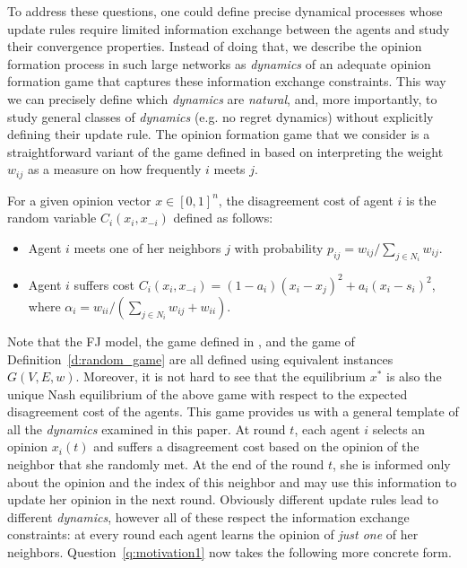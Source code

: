 To address these questions, one could define precise dynamical processes whose
update rules require limited information exchange between the agents and study
their convergence properties. Instead of doing that, we describe the opinion
formation process in such large networks as \emph{dynamics} of an adequate
opinion formation game that captures these information exchange constraints.
This way we can precisely define which \emph{dynamics} are \emph{natural}, and,
more importantly, to study general classes of \emph{dynamics} (e.g. no regret
dynamics) without explicitly defining their update rule.  The opinion formation
game that we consider is a straightforward variant of the game defined in
\cite{BKO11} based on interpreting the weight $w_{ij}$ as a measure on how
frequently $i$ meets $j$.
%
\begin{definition}\label{d:random_game}
  For a given opinion vector $x \in [0,1]^n$, the disagreement cost of agent
  $i$ is the random variable $C_i(x_i,x_{-i})$ defined as follows:
  \begin{itemize}
    \item Agent $i$ meets one of her neighbors $j$ with probability $p_{ij}=
      w_{ij}/\sum_{j\in N_i}w_{ij}$.
    \item Agent $i$ suffers cost $C_i(x_i , x_{-i}) = (1-a_i)(x_i-x_j)^2 +
      a_i(x_i-s_i)^2$, where $\alpha_i = w_{ii}/(\sum_{j\in
        N_i}w_{ij}+w_{ii})$.
  \end{itemize}
\end{definition}
%
Note that the FJ model, the game defined in \cite{BKO11}, and the game of
Definition~\ref{d:random_game} are all defined using equivalent instances
$G(V,E,w)$.  Moreover, it is not hard to see that the equilibrium $x^*$ is also
the unique Nash equilibrium of the above game with respect to the expected
disagreement cost of the agents.
This game provides us with a general template of all the \emph{dynamics}
examined in this paper.  At round $t$, each agent $i$ selects an opinion
$x_i(t)$ and suffers a disagreement cost based on the opinion of the neighbor
that she randomly met.  At the end of the round $t$, she is informed only about
the opinion and the index of this neighbor and may use this information to
update her opinion in the next round.  Obviously different update rules lead to
different \emph{dynamics}, however all of these respect the information
exchange constraints: at every round each agent learns the opinion of \emph{just
  one} of her neighbors.  Question~\ref{q:motivation1} now takes the following
more concrete form.

